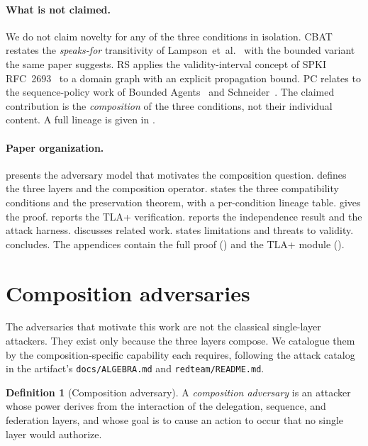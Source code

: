 \documentclass[11pt,a4paper]{article}
\theoremstyle{plain}
\theoremstyle{definition}
\newtheorem{definition}[theorem]{Definition}
\theoremstyle{remark}
\begin{document}
\paragraph{What is not claimed.}

We do not claim novelty for any of the three conditions in isolation. CBAT
restates the \emph{speaks-for} transitivity of
Lampson~et~al.~\cite{lampson1992authentication} with the bounded variant the
same paper suggests. RS applies the validity-interval concept of SPKI
RFC~2693~\cite{rfc2693spki} to a domain graph with an explicit propagation
bound. PC relates to the sequence-policy work of
Bounded Agents~\cite{boundedagents2026} and
Schneider~\cite{schneider2000enforceable}. The claimed contribution is the
\emph{composition} of the three conditions, not their individual content. A
full lineage is given in .

\paragraph{Paper organization.}

 presents the adversary model that motivates the
composition question.  defines the three layers and the
composition operator.  states the three compatibility
conditions and the preservation theorem, with a per-condition lineage table.
 gives the proof.  reports the TLA+
verification.  reports the independence result and the
attack harness.  discusses related work.
 states limitations and threats to validity.
 concludes. The appendices contain the full proof
() and the TLA+ module ().

\section{Composition adversaries}
\label{sec:adversaries}

The adversaries that motivate this work are not the classical single-layer
attackers. They exist only because the three layers compose. We catalogue them
by the composition-specific capability each requires, following the attack
catalog in the artifact's \texttt{docs/ALGEBRA.md} and
\texttt{redteam/README.md}.

\begin{definition}[Composition adversary]
A \emph{composition adversary} is an attacker whose power derives from the
interaction of the delegation, sequence, and federation layers, and whose goal
is to cause an action to occur that no single layer would authorize.
\end{definition}
\end{document}
